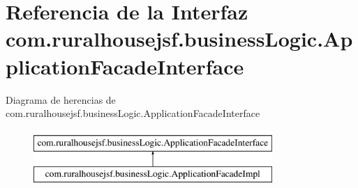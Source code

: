 \hypertarget{interfacecom_1_1ruralhousejsf_1_1business_logic_1_1_application_facade_interface}{}\section{Referencia de la Interfaz com.\+ruralhousejsf.\+business\+Logic.\+Application\+Facade\+Interface}
\label{interfacecom_1_1ruralhousejsf_1_1business_logic_1_1_application_facade_interface}
Diagrama de herencias de com.\+ruralhousejsf.\+business\+Logic.\+Application\+Facade\+Interface\begin{figure}[H]
\begin{center}
\leavevmode
\includegraphics[height=2.000000cm]{d7/d2b/interfacecom_1_1ruralhousejsf_1_1business_logic_1_1_application_facade_interface}
\end{center}
\end{figure}
